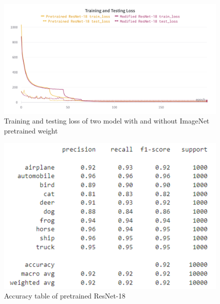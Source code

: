 \documentclass[twocolumn]{extarticle}
\begin{document}
\begin{appendices}
\begin{figure}[H]
\centering
\includegraphics[width=0.9\linewidth]{charts/resnet-18-cifar-10-pretrained-loss}
\caption{Training and testing loss of two model with and without ImageNet pretrained weight}
\label{chart:resnet-18-cifar-10-pretrained-loss}
\end{figure}

\begin{figure}[H]
\centering
\includegraphics[width=0.9\linewidth]{charts/resnet-cifar-auc}
\caption{Accuracy table of pretrained ResNet-18}
\label{chart:resnet-cifar-auc}
\end{figure}


\end{appendices}
\end{document}
